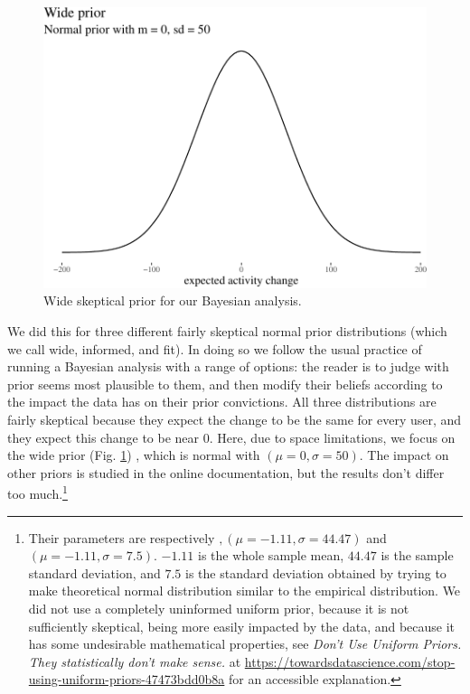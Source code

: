 \documentclass[a4paper,fleqn]{cas-dc}
\begin{document}
\begin{figure}

\begin{center}
\includegraphics[width=1\linewidth]{images/unnamed-chunk-19-1} 
\end{center}
\caption{Wide  skeptical prior for our Bayesian analysis.}
\label{fig:priors}
\end{figure}

We did this for three different fairly skeptical normal prior
distributions (which we call \textsf{wide, informed}, and \textsf{fit}).
In doing so we follow the usual practice of running a Bayesian analysis
with a range of options: the reader is to judge with prior seems most
plausible to them, and then modify their beliefs according to the impact
the data has on their prior convictions. All three distributions are
fairly skeptical because they expect the change to be the same for every
user, and they expect this change to be near 0. Here, due to space limitations, we focus on the wide prior (Fig.
\ref{fig:priors}) , which is normal with \((\mu = 0, \sigma = 50)\).  The impact on other priors is studied in the online
documentation, but the results don't differ too
much.\footnote{Their  parameters are respectively $, (\mu = -1.11, \sigma = 44.47)$ and $(\mu = -1.11, \sigma = 7.5)$.   $-1.11$ is the whole sample mean, $44.47$ is the sample standard deviation, and $7.5$ is the standard deviation obtained by  trying to make  theoretical normal distribution similar to the empirical distribution. We did not use  a completely uninformed uniform prior, because it is  not sufficiently skeptical, being more easily impacted by the data, and because it has some undesirable mathematical properties, see \emph{Don't Use Uniform Priors. They statistically don't make sense.} at \url{https://towardsdatascience.com/stop-using-uniform-priors-47473bdd0b8a} for an accessible explanation.}
\end{document}
